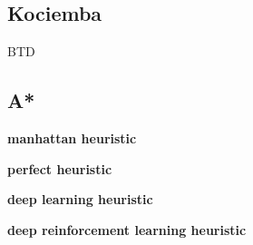\subsection{Kociemba}
BTD


\subsection{A*}
\label{ASSS}

\textbf{manhattan heuristic}

\textbf{perfect heuristic}

\textbf{deep learning heuristic}

\textbf{deep reinforcement learning heuristic}


